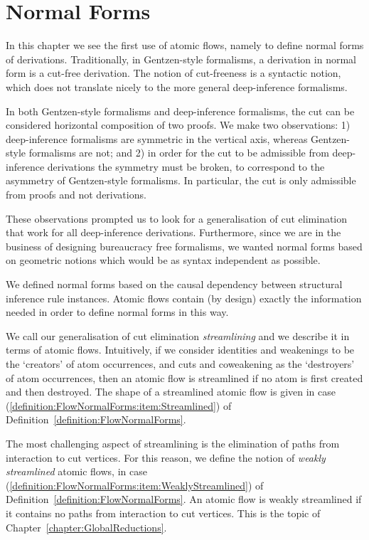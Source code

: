 \chapter{Normal Forms}\label{chapter:NormalForms}

In this chapter we see the first use of atomic flows, namely to define normal forms of derivations. Traditionally, in Gentzen-style formalisms, a derivation in normal form is a cut-free derivation. The notion of cut-freeness is a syntactic notion, which does not translate nicely to the more general deep-inference formalisms.

In both Gentzen-style formalisms and deep-inference formalisms, the cut can be considered horizontal composition of two proofs. We make two observations: 1) deep-inference formalisms are symmetric in the vertical axis, whereas Gentzen-style formalisms are not; and 2) in order for the cut to be admissible from deep-inference derivations the symmetry must be broken, to correspond to the asymmetry of Gentzen-style formalisms. In particular, the cut is only admissible from proofs and not derivations.

These observations prompted us to look for a generalisation of cut elimination that work for all deep-inference derivations. Furthermore, since we are in the business of designing bureaucracy free formalisms, we wanted normal forms based on geometric notions which would be as syntax independent as possible.

We defined normal forms based on the causal dependency between structural inference rule instances. Atomic flows contain (by design) exactly the information needed in order to define normal forms in this way.

We call our generalisation of cut elimination \emph{streamlining} and we describe it in terms of atomic flows. Intuitively, if we consider identities and weakenings to be the `creators' of atom occurrences, and cuts and coweakening as the `destroyers' of atom occurrences, then an atomic flow is streamlined if no atom is first created and then destroyed. The shape of a streamlined atomic flow is given in case (\ref{definition:FlowNormalForms:item:Streamlined}) of Definition~\vref{definition:FlowNormalForms}.

The most challenging aspect of streamlining is the elimination of paths from interaction to cut vertices. For this reason, we define the notion of \emph{weakly streamlined} atomic flows, in case (\ref{definition:FlowNormalForms:item:WeaklyStreamlined}) of Definition~\ref{definition:FlowNormalForms}. An atomic flow is weakly streamlined if it contains no paths from interaction to cut vertices. This is the topic of Chapter~\vref{chapter:GlobalReductions}.

